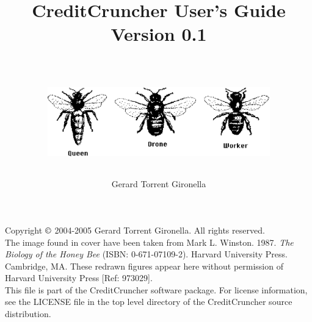 
%
%
%
%
%
%
%
%

\title{CreditCruncher User's Guide \\
Version 0.1 \\
\ \\
\centerline{\includegraphics[height=3cm, angle=0]{threebees.eps}}
}

\author{Gerard Torrent Gironella}

\maketitle

\thispagestyle{empty}

\newpage

\vspace*{7in}

\noindent Copyright $\copyright$ 2004-2005 Gerard Torrent Gironella.  All rights reserved.\\

\noindent The image found in cover have been taken from Mark L. Winston. 1987. 
\emph{The Biology of the Honey Bee} (ISBN: 0-671-07109-2). Harvard University 
Press. Cambridge, MA. These redrawn figures appear here without permission of 
Harvard University Press [Ref: 973029].\\

\noindent This file is part of the CreditCruncher software package.  For
license information, see the LICENSE file in the top level directory
of the CreditCruncher source distribution.
